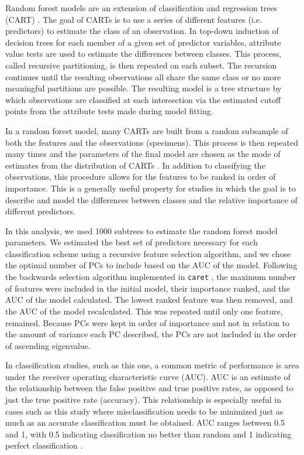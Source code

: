 \documentclass[12pt,letterpaper]{article}
\begin{document}
Random forest models are an extension of classification and regression trees (CART) \citep{Breiman1984,Breiman2001}. The goal of CARTs is to use a series of different features (i.e. predictors) to estimate the class of an observation. In top-down induction of decision trees for each member of a given set of predictor variables, attribute value tests are used to estimate the differences between classes. This process, called recursive partitioning, is then repeated on each subset. The recursion continues until the resulting observations all share the same class or no more meaningful partitions are possible. The resulting model is a tree structure by which observations are classified at each intersection via the estimated cutoff points from the attribute tests made during model fitting. %

In a random forest model, many CARTs are built from a random subsample of both the features and the observations (specimens). This process is then repeated many times and the parameters of the final model are chosen as the mode of estimates from the distribution of CARTs \citep{Breiman2001}. In addition to classifying the observations, this procedure allows for the features to be ranked in order of importance. This is a generally useful property for studies in which the goal is to describe and model the differences between classes and the relative importance of different predictors. 

In this analysis, we used 1000 subtrees to estimate the random forest model parameters. We estimated the best set of predictors necessary for each classification scheme using a recursive feature selection algorithm, and we chose the optimal number of PCs to include based on the AUC of the model. Following the backwards selection algorithm implemented in \texttt{caret} \citep{KuhnMAN2013}, the maximum number of features were included in the initial model, their importance ranked, and the AUC of the model calculated. The lowest ranked feature was then removed, and the AUC of the model recalculated. This was repeated until only one feature, remained. Because PCs were kept in order of importance and not in relation to the amount of variance each PC described, the PCs are not included in the order of ascending eigenvalue.

In classification studies, such as this one, a common metric of performance is area under the receiver operating characteristic curve (AUC). AUC is an estimate of the relationship between the false positive and true positive rates, as opposed to just the true positive rate (accuracy). This relationship is especially useful in cases such as this study where misclassification needs to be minimized just as much as an accurate classification must be obtained. AUC ranges between 0.5 and 1, with 0.5 indicating classification no better than random and 1 indicating perfect classification \citep{Hastie2009}.
\end{document}
